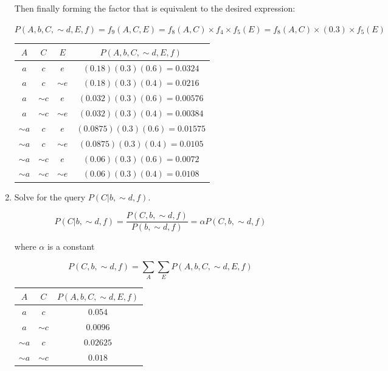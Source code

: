 \documentclass[12pt]{article}
\begin{document}
\begin{enumerate}
Then finally forming the factor that is equivalent to the desired expression:

$P(A,b,C, \sim d,E,f) = f_9(A,C,E) = f_8(A,C) \times f_4 \times f_5(E) = f_8(A,C) \times (0.3) \times f_5(E)$

\begin{center}
	\begin{tabular}{|c|c|c|c|}
		\hline
		$A$ & $C$ & $E$ & $P(A,b,C, \sim d,E,f)$ \\
		\hline
		$a$ & $c$ & $e$ & $(0.18)(0.3)(0.6) = 0.0324 $ \\
		\hline
		$a$ & $c$ & $\sim e$ & $(0.18)(0.3)(0.4) = 0.0216$ \\
		\hline
		$a$ & $\sim c$ & $e$ & $(0.032)(0.3)(0.6) = 0.00576$ \\
		\hline
		$a$ & $\sim c$ & $\sim e$ & $(0.032)(0.3)(0.4) = 0.00384$ \\
		\hline
		$\sim a$ & $c$ & $e$ & $(0.0875)(0.3)(0.6) = 0.01575$ \\
		\hline
		$\sim a$ & $c$ & $\sim e$ & $(0.0875)(0.3)(0.4) = 0.0105$ \\
		\hline
		$\sim a$ & $\sim c$ & $e$ & $(0.06)(0.3)(0.6) = 0.0072$ \\
		\hline
		$\sim a$ & $\sim c$ & $\sim e$ & $(0.06)(0.3)(0.4) = 0.0108$ \\
		\hline
	\end{tabular}
\end{center}

\item Solve for the query $P(C | b, \sim d, f)$.

\[
	P(C | b, \sim d, f) = \frac{P(C, b, \sim d, f)}{P(b, \sim d, f)} = \alpha P(C, b, \sim d, f)
\]

where $\alpha$ is a constant

\[
	P(C, b, \sim d, f) = \sum_A \sum_E P(A,b,C, \sim d,E,f)
\]
\begin{center}
	\begin{tabular}{|c|c|c|}
		\hline
		$A$ & $C$ & $P(A,b,C, \sim d,E,f)$ \\
		\hline
		$a$ & $c$ & $0.054$ \\
		\hline
		$a$ & $\sim c$ & $0.0096$ \\
		\hline
		$\sim a$ & $c$ & $0.02625$ \\
		\hline
		$\sim a$ & $\sim c$ & $0.018$ \\
		\hline
	\end{tabular}
\end{center}


\end{enumerate}
\end{document}
